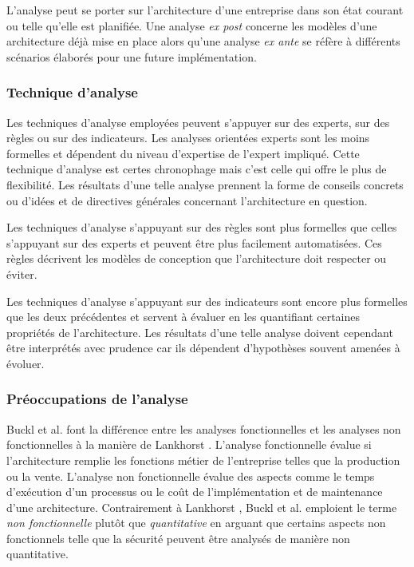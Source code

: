 L'analyse peut se porter sur l'architecture d'une entreprise dans son état
courant ou telle qu'elle est planifiée. Une analyse \textit{ex post} concerne
les modèles d'une architecture déjà mise en place alors qu'une analyse
\textit{ex ante} se réfère à différents scénarios élaborés pour une future
implémentation.

\subsubsection{Technique d'analyse}

Les techniques d'analyse employées peuvent s'appuyer sur des experts, sur des
règles ou sur des indicateurs. Les analyses orientées experts sont les moins
formelles et dépendent du niveau d'expertise de l'expert impliqué. Cette technique d'analyse est certes chronophage mais c'est celle qui offre le plus de flexibilité. Les résultats d'une telle analyse prennent la forme de conseils
concrets ou d'idées et de directives générales concernant l'architecture en
question.

Les techniques d'analyse s'appuyant sur des règles sont plus formelles que
celles s'appuyant sur des experts et peuvent être plus facilement automatisées.
Ces règles décrivent les modèles de conception que l'architecture doit
respecter ou éviter. 

Les techniques d'analyse s'appuyant sur des indicateurs sont encore plus
formelles que les deux précédentes et servent à évaluer en les quantifiant
certaines propriétés de l'architecture. Les résultats d'une telle analyse
doivent cependant être interprétés avec prudence car ils dépendent d'hypothèses
souvent amenées à évoluer.

\subsubsection{Préoccupations de l'analyse}

Buckl et al. \cite{buckl2009classifying} font la différence entre les analyses fonctionnelles et les analyses non
fonctionnelles à la manière de Lankhorst \cite{lankhorst2013enterprise}. L'analyse fonctionnelle évalue si l'architecture remplie les fonctions métier de l'entreprise telles que la production ou la vente. L'analyse non fonctionnelle évalue des aspects comme le
temps d'exécution d'un processus ou le coût de l'implémentation et de
maintenance d'une architecture. Contrairement à Lankhorst \cite{lankhorst2013enterprise}, Buckl et al. \cite{buckl2009classifying}
emploient le terme \textit{non fonctionnelle} plutôt que \textit{quantitative}
en arguant que certains aspects non fonctionnels telle que la sécurité peuvent être analysés de manière non quantitative. 

